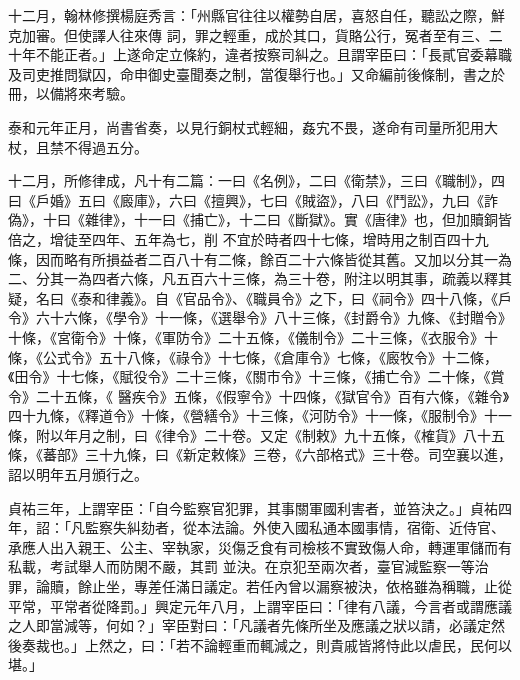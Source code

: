 \begin{pinyinscope}
 十二月，翰林修撰楊庭秀言：「州縣官往往以權勢自居，喜怒自任，聽訟之際，鮮克加審。但使譯人往來傳
 詞，罪之輕重，成於其口，貨賂公行，冤者至有三、二十年不能正者。」上遂命定立條約，違者按察司糾之。且謂宰臣曰：「長貳官委幕職及司吏推問獄囚，命申御史臺聞奏之制，當復舉行也。」又命編前後條制，書之於冊，以備將來考驗。



 泰和元年正月，尚書省奏，以見行銅杖式輕細，姦宄不畏，遂命有司量所犯用大杖，且禁不得過五分。



 十二月，所修律成，凡十有二篇：一曰《名例》，二曰《衛禁》，三曰《職制》，四曰《戶婚》五曰《廄庫》，六曰《擅興》，七曰《賊盜》，八曰《鬥訟》，九曰《詐偽》，十曰《雜律》，十一曰《捕亡》，十二曰《斷獄》。實《唐律》也，但加贖銅皆倍之，增徒至四年、五年為七，削
 不宜於時者四十七條，增時用之制百四十九條，因而略有所損益者二百八十有二條，餘百二十六條皆從其舊。又加以分其一為二、分其一為四者六條，凡五百六十三條，為三十卷，附注以明其事，疏義以釋其疑，名曰《泰和律義》。自《官品令》、《職員令》之下，曰《祠令》四十八條，《戶令》六十六條，《學令》十一條，《選舉令》八十三條，《封爵令》九條、《封贈令》十條，《宮衛令》十條，《軍防令》二十五條，《儀制令》二十三條，《衣服令》十條，《公式令》五十八條，《祿令》十七條，《倉庫令》七條，《廄牧令》十二條，《田令》十七條，《賦役令》二十三條，《關市令》十三條，《捕亡令》二十條，《賞令》二十五條，《
 醫疾令》五條，《假寧令》十四條，《獄官令》百有六條，《雜令》四十九條，《釋道令》十條，《營繕令》十三條，《河防令》十一條，《服制令》十一條，附以年月之制，曰《律令》二十卷。又定《制敕》九十五條，《榷貨》八十五條，《蕃部》三十九條，曰《新定敕條》三卷，《六部格式》三十卷。司空襄以進，詔以明年五月頒行之。



 貞祐三年，上謂宰臣：「自今監察官犯罪，其事關軍國利害者，並笞決之。」貞祐四年，詔：「凡監察失糾劾者，從本法論。外使入國私通本國事情，宿衛、近侍官、承應人出入親王、公主、宰執家，災傷乏食有司檢核不實致傷人命，轉運軍儲而有私載，考試舉人而防閑不嚴，其罰
 並決。在京犯至兩次者，臺官減監察一等治罪，論贖，餘止坐，專差任滿日議定。若任內曾以漏察被決，依格雖為稱職，止從平常，平常者從降罰。」興定元年八月，上謂宰臣曰：「律有八議，今言者或謂應議之人即當減等，何如？」宰臣對曰：「凡議者先條所坐及應議之狀以請，必議定然後奏裁也。」上然之，曰：「若不論輕重而輒減之，則貴戚皆將恃此以虐民，民何以堪。」



\end{pinyinscope}